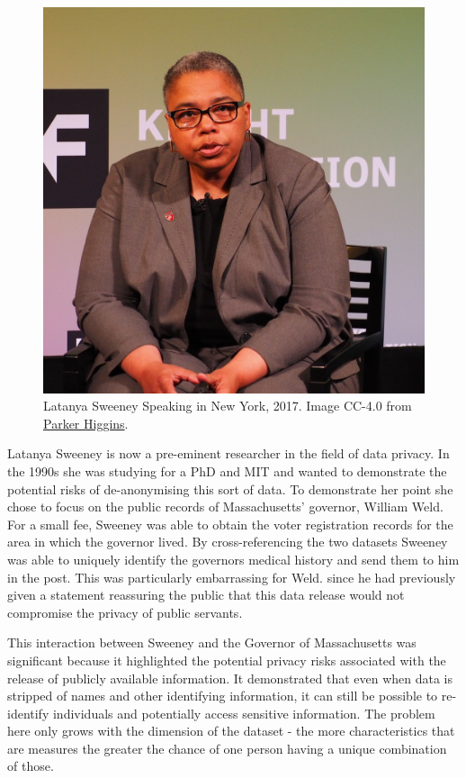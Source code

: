 \documentclass[
  letterpaper,
  DIV=11,
  numbers=noendperiod]{scrreprt}
\begin{document}
\begin{figure}[H]

{\centering \includegraphics{images/501-ethics-privacy/latanya-sweeney.jpg}

}

\caption{Latanya Sweeney Speaking in New York, 2017. Image CC-4.0 from
\href{https://en.wikipedia.org/wiki/User:ParkerHiggins}{Parker
Higgins}.}

\end{figure}%

Latanya Sweeney is now a pre-eminent researcher in the field of data
privacy. In the 1990s she was studying for a PhD and MIT and wanted to
demonstrate the potential risks of de-anonymising this sort of data. To
demonstrate her point she chose to focus on the public records of
Massachusetts' governor, William Weld. For a small fee, Sweeney was able
to obtain the voter registration records for the area in which the
governor lived. By cross-referencing the two datasets Sweeney was able
to uniquely identify the governors medical history and send them to him
in the post. This was particularly embarrassing for Weld. since he had
previously given a statement reassuring the public that this data
release would not compromise the privacy of public servants.

This interaction between Sweeney and the Governor of Massachusetts was
significant because it highlighted the potential privacy risks
associated with the release of publicly available information. It
demonstrated that even when data is stripped of names and other
identifying information, it can still be possible to re-identify
individuals and potentially access sensitive information. The problem
here only grows with the dimension of the dataset - the more
characteristics that are measures the greater the chance of one person
having a unique combination of those.
\end{document}
